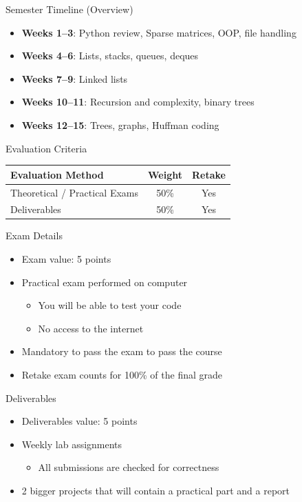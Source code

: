 \documentclass[11pt]{beamer}
\begin{document}
\begin{frame}{Semester Timeline (Overview)}
\small
\begin{itemize}
\item \textbf{Weeks 1--3}: Python review, Sparse matrices, OOP, file handling
\item \textbf{Weeks 4--6}: Lists, stacks, queues, deques
\item \textbf{Weeks 7--9}: Linked lists
\item \textbf{Weeks 10--11}: Recursion and complexity, binary trees
\item \textbf{Weeks 12--15}: Trees, graphs, Huffman coding
\end{itemize}
\end{frame}




\begin{frame}{Evaluation Criteria}
\centering
\renewcommand{\arraystretch}{1.3}
\begin{tabular}{lcc}
\toprule
\textbf{Evaluation Method} & \textbf{Weight} & \textbf{Retake} \\
\midrule
Theoretical / Practical Exams & 50\% & Yes \\
Deliverables & 50\% & Yes \\
\bottomrule
\end{tabular}
\end{frame}


\begin{frame}{Exam Details}
\begin{itemize}
\item Exam value: 5 points
\item Practical exam performed on computer
\begin{itemize}
\item You will be able to test your code
\item No access to the internet
\end{itemize}
\item Mandatory to pass the exam to pass the course
\item Retake exam counts for 100\% of the final grade
\end{itemize}
\end{frame}


\begin{frame}{Deliverables}
\begin{itemize}
\item Deliverables value: 5 points
\item Weekly lab assignments
\begin{itemize}
\item All submissions are checked for correctness
\end{itemize}
\item 2 bigger projects that will contain a practical part and a report
\end{itemize}
\end{frame}
\end{document}
